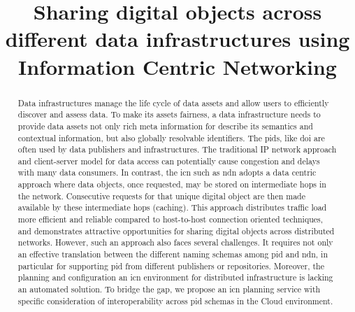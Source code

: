 \documentclass[conference]{IEEEtran}
\begin{document}
\title{Sharing digital objects across different data infrastructures using Information Centric Networking
}

\author{
}

\maketitle

\begin{abstract}
Data infrastructures manage the life cycle of data assets and allow users to efficiently discover and assess data. To make its assets \gls{fairness}, a data infrastructure needs to provide data assets not only rich meta information for describe its semantics and contextual information, but also globally resolvable identifiers. The \glspl{pid}, like \gls{doi} are often used by data publishers and infrastructures. The traditional IP network approach and client-server model for data access can potentially cause congestion and delays with many data consumers. In contrast, the \gls{icn} such as \gls{ndn} adopts a data centric approach where data objects, once requested, may be stored on intermediate hops in the network. Consecutive requests for that unique digital object are then made available by these intermediate hops (caching). This approach distributes traffic load more efficient and reliable compared to host-to-host connection oriented techniques, and demonstrates attractive opportunities for sharing digital objects across distributed networks. However, such an approach also faces several challenges. It requires not only an effective translation between the different naming schemas among \gls{pid} and \gls{ndn}, in particular for supporting \gls{pid} from different publishers or repositories. Moreover, the planning and configuration an \gls{icn} environment for distributed infrastructure is lacking an automated solution. To bridge the gap, we propose an \gls{icn} planning service with specific consideration of interoperability across \gls{pid} schemas in the Cloud environment.


\end{abstract}
\end{document}
